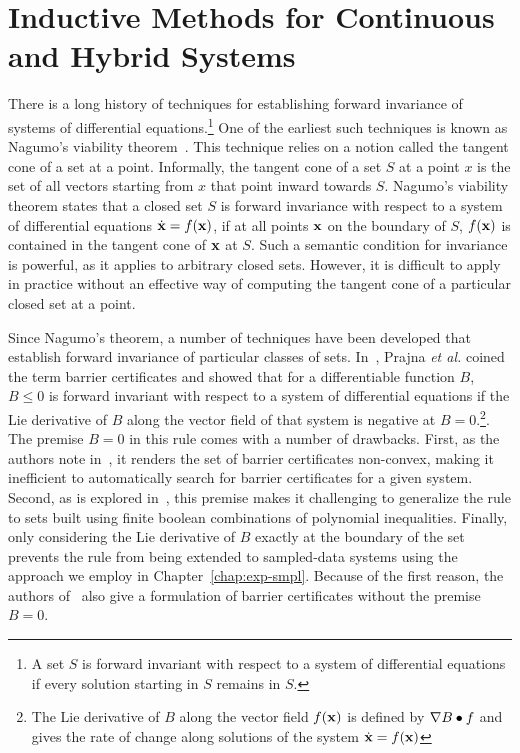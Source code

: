 \section{Inductive Methods for Continuous and Hybrid Systems}
There is a long history of techniques for establishing forward invariance
of systems of differential equations.\footnote{A set $S$ is forward
  invariant with respect to a system of differential equations if every
  solution starting in $S$ remains in $S$.} One of the earliest such
techniques is known as Nagumo's viability
theorem~\cite{aubin2009viability}. This technique relies on a notion called
the tangent cone of a set at a point. Informally, the tangent cone of a set
$S$ at a point $x$ is the set of all vectors starting from $x$ that point
inward towards $S$. Nagumo's viability theorem states that a closed set $S$
is forward invariance with respect to a system of differential equations
$\dot{\mathbf{x}} = f(\mathbf{x})$, if at all points $\mathbf{x}$ on the
boundary of $S$, $f(\mathbf{x})$ is contained in the tangent cone of
$\mathbf{x}$ at $S$. Such a semantic condition for invariance is powerful,
as it applies to arbitrary closed sets. However, it is difficult to apply
in practice without an effective way of computing the tangent cone of a
particular closed set at a point.

Since Nagumo's theorem, a number of techniques have been developed that
establish forward invariance of particular classes of
sets. In~\cite{prajna04barrier}, Prajna \emph{et al.} coined the term
barrier certificates and showed that for a differentiable function $B$, $B
\leq 0$ is forward invariant with respect to a system of differential
equations if the Lie derivative of $B$ along the vector field of that
system is negative at $B = 0$.\footnote{The Lie derivative of $B$ along the
  vector field $f(\mathbf{x})$ is defined by $\nabla B \bullet f$ and
  gives the rate of change along solutions of the system $\dot{\mathbf{x}}
  = f(\mathbf{x})$}. The premise $B=0$ in this rule comes with a number of
drawbacks. First, as the authors note in~\cite{prajna04barrier}, it renders
the set of barrier certificates non-convex, making it inefficient to
automatically search for barrier certificates for a given system. Second,
as is explored in~\cite{Ghorbal17inv}, this premise makes it challenging to
generalize the rule to sets built using finite boolean combinations of
polynomial inequalities. Finally, only considering the Lie derivative of
$B$ exactly at the boundary of the set prevents the rule from being
extended to sampled-data systems using the approach we employ in
Chapter~\ref{chap:exp-smpl}. Because of the first reason, the authors
of~\cite{prajna04barrier} also give a formulation of barrier certificates
without the premise $B = 0$.

